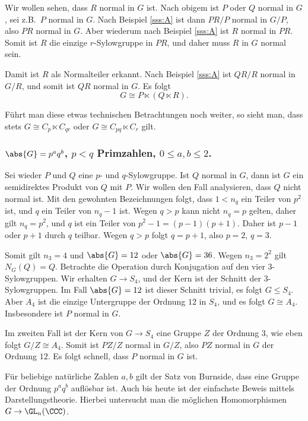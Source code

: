 \documentclass[12pt,a4paper,twoside]{article}
\begin{document}
Wir wollen sehen, dass $R$ normal in $G$ ist. Nach obigem ist $P$ oder $Q$
normal in $G$, sei z.B.\ $P$ normal in $G$. Nach Beispiel \ref{sss:A} ist dann
$PR/P$ normal in $G/P$, also $PR$ normal in $G$. Aber wiederum nach Beispiel
\ref{sss:A} ist $R$ normal in $PR$. Somit ist $R$ die einzige $r$-Sylowgruppe
in $PR$, und daher muss $R$ in $G$ normal sein.

Damit ist $R$ als Normalteiler erkannt. Nach Beispiel \ref{sss:A} ist $QR/R$
normal in $G/R$, und somit ist $QR$ normal in $G$. Es folgt
\[
G\cong P\ltimes (Q\ltimes R).
\]

F\"uhrt man diese etwas technischen Betrachtungen noch weiter, so sieht man,
dass stets $G\cong C_p\ltimes C_{qr}$ oder $G\cong C_{pq}\ltimes C_r$ gilt.
\subsubsection{$\abs{G}=p^aq^b$, $p<q$ Primzahlen, $0\le a,b\le 2$.}
Sei wieder $P$ und $Q$ eine $p$- und $q$-Sylowgruppe. Ist $Q$ normal in $G$,
dann ist $G$ ein semidirektes Produkt von $Q$ mit $P$. Wir wollen den Fall
analysieren, dass $Q$ nicht normal ist. Mit den gewohnten Bezeichnungen folgt,
dass $1<n_q$ ein Teiler von $p^2$ ist, und $q$ ein Teiler von $n_q-1$
ist. Wegen $q>p$ kann nicht $n_q=p$ gelten, daher gilt $n_q=p^2$, und $q$ ist
ein Teiler von $p^2-1=(p-1)(p+1)$. Daher ist $p-1$ oder $p+1$ durch $q$
teilbar. Wegen $q>p$ folgt $q=p+1$, also $p=2$, $q=3$.

Somit gilt $n_3=4$ und $\abs{G}=12$ oder $\abs{G}=36$. Wegen $n_3=2^2$ gilt
$N_G(Q)=Q$. Betrachte die Operation durch Konjugation auf den vier
$3$-Sylowgruppen. Wir erhalten $G\to S_4$, und der Kern ist der Schnitt der
$3$-Sylowgruppen. Im Fall $\abs{G}=12$ ist dieser Schnitt trivial, es folgt
$G\le S_4$. Aber $A_4$ ist die einzige Untergruppe der Ordnung $12$ in
$S_4$, und es folgt $G\cong A_4$. Insbesondere ist $P$ normal in $G$.

Im zweiten Fall ist der Kern von $G\to S_4$ eine Gruppe $Z$ der Ordnung $3$,
wie eben folgt $G/Z\cong A_4$. Somit ist $PZ/Z$ normal in $G/Z$, also $PZ$
normal in $G$ der Ordnung $12$. Es folgt schnell, dass $P$ normal in $G$ ist.
\begin{Bemerkung*}
  F\"ur beliebige nat\"urliche Zahlen $a,b$ gilt der Satz von Burnside, dass
  eine Gruppe der Ordnung $p^aq^b$ aufl\"osbar ist. Auch bis heute ist der
  einfachste Beweis mittels Darstellungstheorie. Hierbei untersucht man die
  m\"oglichen Homomorphismen $G\to\GL_n(\CCC)$.
\end{Bemerkung*}
\end{document}
